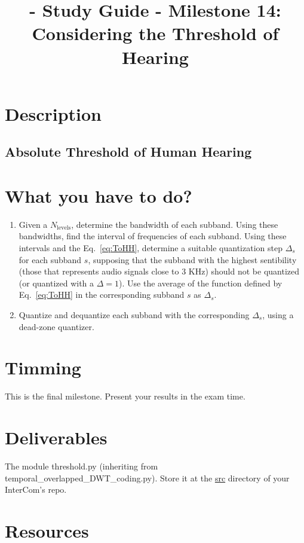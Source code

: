 
\title{\TM{} - Study Guide - Milestone 14: Considering the Threshold of Hearing}

\maketitle

\section{Description}

\subsection{Absolute Threshold of Human Hearing}

\sub
\section{What you have to do?}

  
\begin{enumerate}
\item Given a $N_{\text{levels}}$, determine the bandwidth of each
  subband. Using these bandwidths, find the interval of frequencies of
  each subband. Using these intervals and the Eq.~\ref{eq:ToHH},
  determine a suitable quantization step $\Delta_s$ for each subband
  $s$, supposing that the subband with the highest sentibility (those
  that represents audio signals close to $3$ KHz) should not be
  quantized (or quantized with a $\Delta=1$). Use the average of the
  function defined by Eq.~\ref{eq:ToHH} in the corresponding subband
  $s$ as $\Delta_s$.
\item Quantize and dequantize each subband with the corresponding
  $\Delta_s$, using a dead-zone quantizer.
\end{enumerate}

\section{Timming}

This is the final milestone. Present your results in the exam time.

\section{Deliverables}

The module threshold.py (inheriting from temporal\_overlapped\_DWT\_coding.py). Store it at the
\href{https://github.com/Tecnologias-multimedia/intercom/src}{src}
  directory of your InterCom's repo.

\section{Resources}



